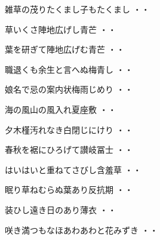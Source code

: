 \begin{shiika}雑草の茂りたくまし子もたくまし
\hfill{・・}\end{shiika}
\vspace{0.6cm}
\begin{shiika}草いくさ陣地広げし青芒
\hfill{・・}\end{shiika}
\vspace{0.6cm}
\begin{shiika}葉を研ぎて陣地広げむ青芒
\hfill{・・}\end{shiika}
\vspace{0.6cm}
\begin{shiika}職退くも余生と言へぬ梅青し
\hfill{・・}\end{shiika}
\vspace{0.6cm}
\begin{shiika}娘名で忌の案内状梅雨じめり
\hfill{・・}\end{shiika}
\vspace{0.6cm}
\begin{shiika}海の風山の風入れ夏座敷
\hfill{・・}\end{shiika}
\vspace{0.6cm}
\begin{shiika}夕木槿汚れなき白閉じにけり
\hfill{・・}\end{shiika}
\vspace{0.6cm}
\begin{shiika}春秋を裾にひろげて讃岐冨士
\hfill{・・}\end{shiika}
\vspace{0.6cm}
\begin{shiika}はいはいと重ねてさびし含羞草
\hfill{・・}\end{shiika}
\vspace{0.6cm}
\begin{shiika}眠り草ねむらぬ葉あり反抗期
\hfill{・・}\end{shiika}
\vspace{0.6cm}
\begin{shiika}装ひし遠き日のあり薄衣
\hfill{・・}\end{shiika}
\vspace{0.6cm}
\begin{shiika}咲き満つもなほあわあわと花みずき
\hfill{・・}\end{shiika}
